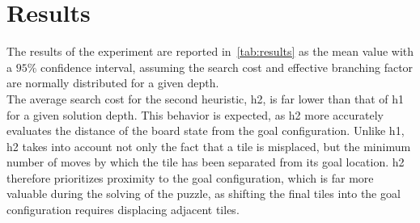 
\section{Results}
\label{sec:results}

The results of the experiment are reported in~\ref{tab:results} as the mean value with a $95\%$ confidence interval, assuming the search cost and effective branching factor are normally distributed for a given depth. \\

The average search cost for the second heuristic, h2, is far lower than that of h1 for a given solution depth.  This behavior is expected, as h2 more accurately evaluates the distance of the board state from the goal configuration.  Unlike h1, h2 takes into account not only the fact that a tile is misplaced, but the minimum number of moves by which the tile has been separated from its goal location.  h2 therefore prioritizes proximity to the goal configuration, which is far more valuable during the solving of the puzzle, as shifting the final tiles into the goal configuration requires displacing adjacent tiles.





